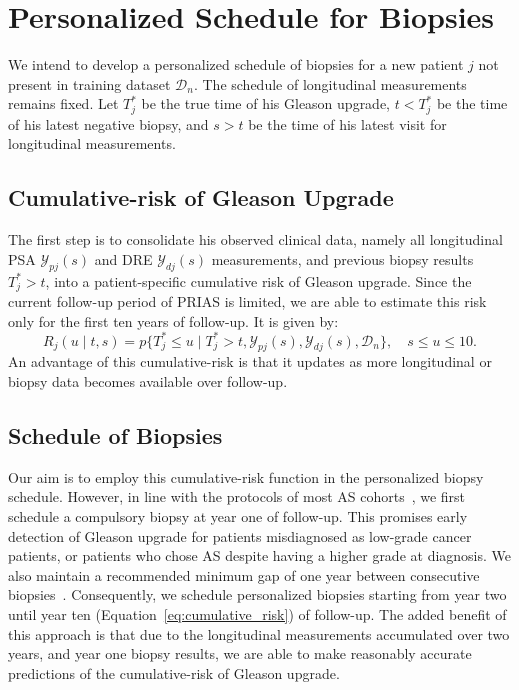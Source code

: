 \section{Personalized Schedule for Biopsies}
\label{sec:schedule}
We intend to develop a personalized schedule of biopsies for a new patient $j$ not present in training dataset $\mathcal{D}_n$. The schedule of longitudinal measurements remains fixed. Let $T^*_j$ be the true time of his Gleason upgrade, ${t < T^*_j}$ be the time of his latest negative biopsy, and ${s > t}$ be the time of his latest visit for longitudinal measurements.

\subsection{Cumulative-risk of Gleason Upgrade}
\label{subsec:cum_risk}
The first step is to consolidate his observed clinical data, namely all longitudinal PSA $\mathcal{Y}_{pj}(s)$ and DRE $\mathcal{Y}_{dj}(s)$ measurements, and previous biopsy results ${T^*_j > t}$, into a patient-specific cumulative risk of Gleason upgrade. Since the current follow-up period of PRIAS is limited, we are able to estimate this risk only for the first ten years of follow-up. It is given by:
\begin{equation}
\label{eq:cumulative_risk}
R_j(u \mid t, s) = p\Big\{T^*_j \leq u \mid T^*_j > t, \mathcal{Y}_{pj}(s), \mathcal{Y}_{dj}(s), \mathcal{D}_n\Big\}, \quad s \leq u \leq 10.
\end{equation}
An advantage of this cumulative-risk is that it updates as more longitudinal or biopsy data becomes available over follow-up.

\subsection{Schedule of Biopsies}
Our aim is to employ this cumulative-risk function in the personalized biopsy schedule. However, in line with the protocols of most AS cohorts~\citep{nieboer2018active}, we first schedule a compulsory biopsy at year one of follow-up. This promises early detection of Gleason upgrade for patients misdiagnosed as low-grade cancer patients, or patients who chose AS despite having a higher grade at diagnosis. We also maintain a recommended minimum gap of one year between consecutive biopsies~\citep{bokhorst2016decade}. Consequently, we schedule personalized biopsies starting from year two until year ten (Equation~\ref{eq:cumulative_risk}) of follow-up. The added benefit of this approach is that due to the longitudinal measurements accumulated over two years, and year one biopsy results, we are able to make reasonably accurate predictions of the cumulative-risk of Gleason upgrade.

